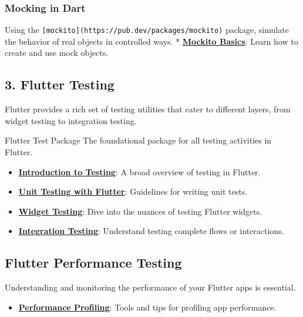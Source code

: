 \documentclass[
]{article}
\providecommand{\tightlist}{%
  \setlength{\itemsep}{0pt}\setlength{\parskip}{0pt}}
\begin{document}
\subsubsection{Mocking in Dart}\label{mocking-in-dart}

Using the \texttt{{[}mockito{]}(https://pub.dev/packages/mockito)}
package, simulate the behavior of real objects in controlled ways. *
\href{https://pub.dev/packages/mockito}{\textbf{Mockito Basics}}: Learn
how to create and use mock objects.

\subsection{3. Flutter Testing}\label{flutter-testing}

Flutter provides a rich set of testing utilities that cater to different
layers, from widget testing to integration testing.

Flutter Test Package The foundational package for all testing activities
in Flutter.

\begin{itemize}
\tightlist
\item
  \href{https://docs.flutter.dev/testing}{\textbf{Introduction to
  Testing}}: A broad overview of testing in Flutter.
\item
  \href{https://docs.flutter.dev/cookbook/testing/unit/introduction}{\textbf{Unit
  Testing with Flutter}}: Guidelines for writing unit tests.
\item
  \href{https://docs.flutter.dev/cookbook/testing/widget/introduction}{\textbf{Widget
  Testing}}: Dive into the nuances of testing Flutter widgets.
\item
  \href{https://docs.flutter.dev/cookbook/testing/integration/introduction}{\textbf{Integration
  Testing}}: Understand testing complete flows or interactions.
\end{itemize}

\subsection{Flutter Performance
Testing}\label{flutter-performance-testing}

Understanding and monitoring the performance of your Flutter apps is
essential.

\begin{itemize}
\tightlist
\item
  \href{https://flutter.dev/docs/testing/ui-performance}{\textbf{Performance
  Profiling}}: Tools and tips for profiling app performance.
\end{itemize}
\end{document}
